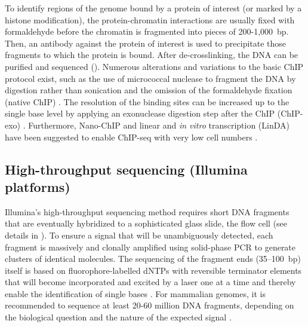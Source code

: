 To identify regions of the genome bound by a protein of interest (or marked by a histone modification), the protein-chromatin interactions are usually fixed with formaldehyde before the chromatin is fragmented into pieces of 200-1,000~bp. Then, an antibody against the protein of interest is used to precipitate those fragments to which the protein is bound. After de-crosslinking, the DNA can be purified and sequenced (). Numerous alterations and variations to the basic ChIP protocol exist, such as the use of micrococcal nuclease to fragment the DNA by digestion rather than sonication \citep{Kasinathan2014} and the omission of the formaldehyde fixation (native ChIP) \citep{Neill2003}. The resolution of the binding sites can be increased up to the single base level by applying an exonuclease digestion step after the ChIP (ChIP-exo) \citep{Rhee2011}. Furthermore, Nano-ChIP and linear and \textit{in vitro} transcription (LinDA) have been suggested to enable ChIP-seq with very low cell numbers \citep{Adli2011, Shanka2011}.
%
\subsection{High-throughput sequencing (Illumina platforms)}
Illumina’s high-throughput sequencing method requires short DNA fragments that are eventually hybridized to a sophisticated glass slide, the flow cell (see details in ). To ensure a signal that will be unambiguously detected, each fragment is massively and clonally amplified using solid-phase PCR to generate clusters of identical molecules. The sequencing of the fragment ends (35–100~bp) itself is based on fluorophore-labelled dNTPs with reversible terminator elements that will become incorporated and excited by a laser one at a time and thereby enable the identification of single bases \citep{Illumina}. For mammalian genomes, it is recommended to sequence at least 20-60 million DNA fragments, depending on the biological question and the nature of the expected signal \citep{Chen2012, Landt2012, Jung2014}.\\
%

%
